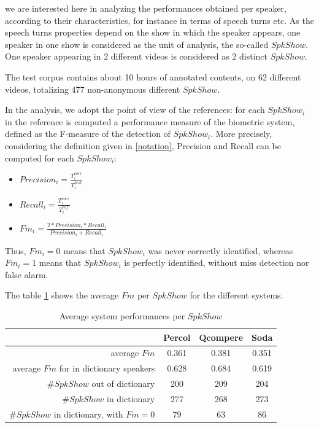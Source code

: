 we are interested here in analyzing the performances obtained per speaker, according to their characteristics, for instance in terms of speech turns etc. As the speech turns properties depend on the show in which the speaker appears, one speaker in one show is considered as the unit of analysis, the so-called $SpkShow$. One speaker appearing in 2 different videos is considered as 2 distinct $SpkShow$.

The test corpus contains about 10 hours of annotated contents, on 62 different videos, totalizing 477 non-anonymous different $SpkShow$.

In the analysis, we adopt the point of view of the references: for each $SpkShow_i$ in the reference is computed a performance measure of the biometric system, defined as the F-measure of the detection of $SpkShow_i$. More precisely, considering the definition given in \ref{notation}, Precision and Recall can be computed for each $SpkShow_i$:
\begin{itemize}
\item $Precision_i=\frac{T^{corr}_i}{T^{test}_i}$
\item $Recall_i=\frac{T^{corr}_i}{T^{ref}_i}$
\item $Fm_i=\frac{2*Precision_i*Recall_i}{Precision_i+Recall_i}$
\end{itemize} 

Thus, $Fm_i=0$ means that $SpkShow_i$ was never correctly identified, whereas $Fm_i=1$ means that $SpkShow_i$ is perfectly identified, without miss detection nor false alarm.

The table \ref{table-spkshow-perf} shows the average $Fm$ per $SpkShow$ for the different systems.
\begin{table}[t]
\begin{center}
\begin{tabular}{r||c|c|c}
& Percol & Qcompere & Soda \\\hline\hline
average $Fm$ & 0.361 & 0.381 & 0.351\\\hline
average $Fm$ for in dictionary speakers & 0.628 & 0.684 & 0.619\\\hline
\#$SpkShow$ out of dictionary & 200 & 209 & 204 \\\hline
\#$SpkShow$ in dictionary & 277& 268 & 273\\\hline
\#$SpkShow$ in dictionary, with $Fm=0$ & 79 & 63 & 86\\\hline
\end{tabular}
\caption{Average system performances per $SpkShow$}
\label{table-spkshow-perf}
\end{center}
\end{table}


